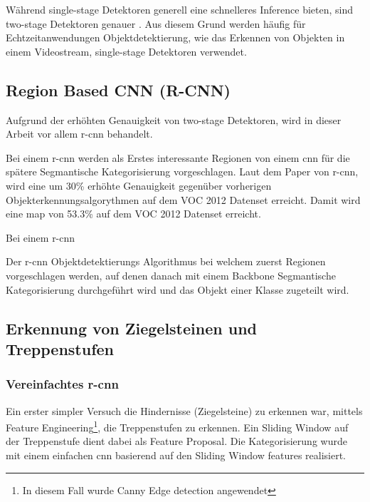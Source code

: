 Während single-stage Detektoren generell eine schnelleres Inference bieten, sind two-stage Detektoren genauer \cite{soviany2018optimizing}.
Aus diesem Grund werden häufig für Echtzeitanwendungen Objektdetektierung, wie das Erkennen von Objekten in einem Videostream, single-stage
Detektoren verwendet.

\newpage

\subsection{Region Based CNN (R-CNN)}

Aufgrund der erhöhten Genauigkeit von two-stage Detektoren, wird in dieser Arbeit vor allem \acrshort{r-cnn} behandelt.

Bei einem \acrshort{r-cnn} \cite{girshick2014rich} werden als Erstes interessante Regionen von einem \acrshort{cnn} für die 
spätere Segmantische Kategorisierung vorgeschlagen. Laut dem Paper von \acrshort{r-cnn}, wird eine um 30\% erhöhte Genauigkeit 
gegenüber vorherigen Objekterkennungsalgorythmen auf dem VOC 2012 Datenset erreicht. Damit wird eine \acrfull{map} von 53.3\%
auf dem VOC 2012 Datenset erreicht.

Bei einem \acrshort{r-cnn} 

{
  Der \acrfull{r-cnn} \cite{girshick2014rich} Objektdetektierungs Algorithmus bei welchem zuerst Regionen 
  vorgeschlagen werden, auf denen danach mit einem Backbone Segmantische Kategorisierung durchgeführt wird und
  das Objekt einer Klasse zugeteilt wird.
}

\newpage

\subsection{Erkennung von Ziegelsteinen und Treppenstufen}

\subsubsection{Vereinfachtes \acrshort{r-cnn}}

Ein erster simpler Versuch die Hindernisse (Ziegelsteine) zu erkennen war, mittels Feature Engineering\footnote{
In diesem Fall wurde Canny Edge detection \cite{canny-edge-detection} angewendet}, die Treppenstufen zu
erkennen. Ein Sliding Window auf der Treppenstufe dient dabei als Feature Proposal.
Die Kategorisierung wurde mit einem einfachen \acrshort{cnn} basierend auf den Sliding Window features 
realisiert.

